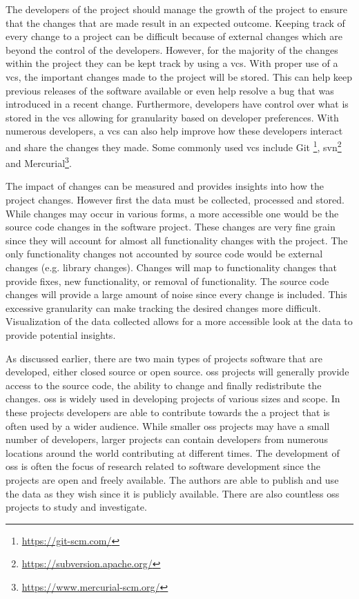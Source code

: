 The developers of the project should manage the growth of the project to ensure that the changes that are made result in an expected outcome. Keeping track of every change to a project can be difficult because of external changes which are beyond the control of the developers. However, for the majority of the changes within the project they can be kept track by using a \gls{vcs}. With proper use of a \gls{vcs}, the important changes made to the project will be stored. This can help keep previous releases of the software available or even help resolve a bug that was introduced in a recent change. Furthermore, developers have control over what is stored in the \gls{vcs} allowing for granularity based on developer preferences. With numerous developers, a \gls{vcs} can also help improve how these developers interact and share the changes they made. Some commonly used \gls{vcs} include Git \footnote{\url{https://git-scm.com/}}, \gls{svn}\footnote{\url{https://subversion.apache.org/}} and Mercurial\footnote{\url{https://www.mercurial-scm.org/}}.

The impact of changes can be measured and provides insights into how the project changes. However first the data must be collected, processed and stored. While changes may occur in various forms, a more accessible one would be the source code changes in the software project. These changes are very fine grain since they will account for almost all functionality changes with the project. The only functionality changes not accounted by source code would be external changes (e.g. library changes). Changes will map to functionality changes that provide fixes, new functionality, or removal of functionality. The source code changes will provide a large amount of noise since every change is included. This excessive granularity can make tracking the desired changes more difficult. Visualization of the data collected allows for a more accessible look at the data to provide potential insights.



As discussed earlier, there are two main types of projects software that are developed, either closed source or open source. \gls{oss} projects will generally provide access to the source code, the ability to change and finally redistribute the changes. \gls{oss} is widely used in developing projects of various sizes and scope. In these projects developers are able to contribute towards the a project that is often used by a wider audience. While smaller \gls{oss} projects may have a small number of developers, larger projects can contain developers from numerous locations around the world contributing at different times. The development of \gls{oss} is often the focus of research related to software development since the projects are open and freely available. The authors are able to publish and use the data as they wish since it is publicly available. There are also countless \gls{oss} projects to study and investigate.

